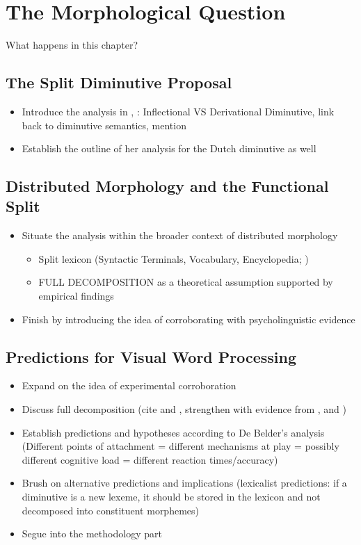 \chapter{The Morphological Question}\label{chp:proposal}

What happens in this chapter? \par

\section{The Split Diminutive Proposal}
\label{sec:3-split-dim}
\begin{itemize}
    \item Introduce the analysis in \cite{DeBelder+etal+2014}, \cite{DeBelder+2011a}: Inflectional VS Derivational Diminutive, link back to diminutive semantics, mention \cite{Wiltschko+2006}
    \item Establish the outline of her analysis for the Dutch diminutive as well
\end{itemize}
\section{Distributed Morphology and the Functional Split}
\begin{itemize}
    \item Situate the analysis within the broader context of distributed morphology
    \begin{itemize}
        \item Split lexicon (Syntactic Terminals, Vocabulary, Encyclopedia; \cite{Embick+2015})
        \item FULL DECOMPOSITION as a theoretical assumption supported by empirical findings
    \end{itemize}
    \item Finish by introducing the idea of corroborating with psycholinguistic evidence
\end{itemize}
\section{Predictions for Visual Word Processing}
\begin{itemize}
    \item Expand on the idea of experimental corroboration
    \item Discuss full decomposition (cite \cite{Taft+1979} and \cite{Taft+2004}, strengthen with evidence from \cite{Fruchter+Marantz+2015}, \cite{Stockall+Marantz2006} and \cite{Fruchter+etal+2013})
    \item Establish predictions and hypotheses according to De Belder's analysis (Different points of attachment = different mechanisms at play = possibly different cognitive load = different reaction times/accuracy)
    \item Brush on alternative predictions and implications (lexicalist predictions: if a diminutive is a new lexeme, it should be stored in the lexicon and not decomposed into constituent morphemes)
    \item Segue into the methodology part
\end{itemize}

